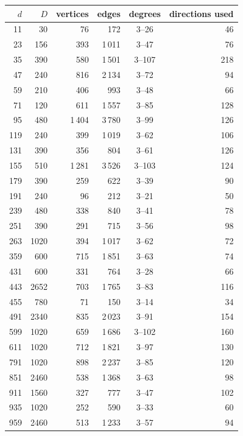 \begin{tabular}{rrrrcr}
\hline
$d$ & $D$ & vertices & edges & degrees & directions used\\
\hline
11 & 30 & 76 & 172 & 3--26 & 46\\
23 & 156 & 393 & 1\,011 & 3--47 & 76\\
35 & 390 & 580 & 1\,501 & 3--107 & 218\\
47 & 240 & 816 & 2\,134 & 3--72 & 94\\
59 & 210 & 406 & 993 & 3--48 & 66\\
71 & 120 & 611 & 1\,557 & 3--85 & 128\\
95 & 480 & 1\,404 & 3\,780 & 3--99 & 126\\
119 & 240 & 399 & 1\,019 & 3--62 & 106\\
131 & 390 & 356 & 804 & 3--61 & 126\\
155 & 510 & 1\,281 & 3\,526 & 3--103 & 124\\
179 & 390 & 259 & 622 & 3--39 & 90\\
191 & 240 & 96 & 212 & 3--21 & 50\\
239 & 480 & 338 & 840 & 3--41 & 78\\
251 & 390 & 291 & 715 & 3--56 & 98\\
263 & 1020 & 394 & 1\,017 & 3--62 & 72\\
359 & 600 & 715 & 1\,851 & 3--63 & 74\\
431 & 600 & 331 & 764 & 3--28 & 66\\
443 & 2652 & 703 & 1\,765 & 3--83 & 116\\
455 & 780 & 71 & 150 & 3--14 & 34\\
491 & 2340 & 835 & 2\,023 & 3--91 & 154\\
599 & 1020 & 659 & 1\,686 & 3--102 & 160\\
611 & 1020 & 712 & 1\,821 & 3--97 & 130\\
791 & 1020 & 898 & 2\,237 & 3--85 & 120\\
851 & 2460 & 538 & 1\,368 & 3--63 & 98\\
911 & 1560 & 327 & 777 & 3--47 & 102\\
935 & 1020 & 252 & 590 & 3--33 & 60\\
959 & 2460 & 513 & 1\,233 & 3--57 & 94\\
\hline
\end{tabular}
